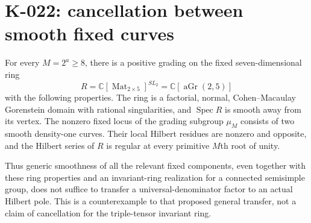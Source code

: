 \section{K-022: cancellation between smooth fixed curves}

\begin{theorem}[K-022]
For every $M=2^a\ge8$, there is a positive grading on the fixed
seven-dimensional ring
\[
 R=\mathbb C[\operatorname{Mat}_{2\times5}]^{SL_2}
       =\mathbb C[\operatorname{aGr}(2,5)]
\]
with the following properties.  The ring is a factorial, normal,
Cohen--Macaulay Gorenstein domain with rational singularities,
and $\operatorname{Spec}R$ is smooth away from its vertex.
The nonzero fixed locus of the grading subgroup $\mu_M$ consists
of two smooth density-one curves.  Their local Hilbert residues
are nonzero and opposite, and the Hilbert series of $R$ is regular
at every primitive $M$th root of unity.

Thus generic smoothness of all the relevant fixed components,
even together with these ring properties and an invariant-ring
realization for a connected semisimple group, does not suffice
to transfer a universal-denominator factor to an actual Hilbert
pole.  This is a counterexample to that proposed general transfer,
not a claim of cancellation for the triple-tensor invariant ring.
\end{theorem}


